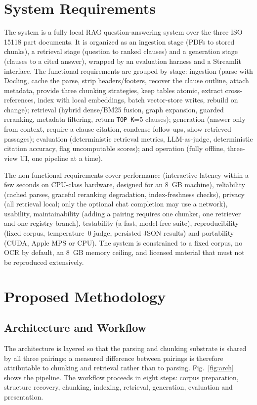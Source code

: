 \documentclass[conference]{IEEEtran}
\begin{document}
\section{System Requirements}
The system is a fully local RAG question-answering system over the three ISO 15118 part documents. It is organized as an ingestion stage (PDFs to stored chunks), a retrieval stage (question to ranked clauses) and a generation stage (clauses to a cited answer), wrapped by an evaluation harness and a Streamlit interface. The functional requirements are grouped by stage: ingestion (parse with Docling, cache the parse, strip headers/footers, recover the clause outline, attach metadata, provide three chunking strategies, keep tables atomic, extract cross-references, index with local embeddings, batch vector-store writes, rebuild on change); retrieval (hybrid dense/BM25 fusion, graph expansion, guarded reranking, metadata filtering, return \texttt{TOP\_K}=5 clauses); generation (answer only from context, require a clause citation, condense follow-ups, show retrieved passages); evaluation (deterministic retrieval metrics, LLM-as-judge, deterministic citation accuracy, flag uncomputable scores); and operation (fully offline, three-view UI, one pipeline at a time).

The non-functional requirements cover performance (interactive latency within a few seconds on CPU-class hardware, designed for an 8~GB machine), reliability (cached parses, graceful reranking degradation, index-freshness checks), privacy (all retrieval local; only the optional chat completion may use a network), usability, maintainability (adding a pairing requires one chunker, one retriever and one registry branch), testability (a fast, model-free suite), reproducibility (fixed corpus, temperature~0 judge, persisted JSON results) and portability (CUDA, Apple MPS or CPU). The system is constrained to a fixed corpus, no OCR by default, an 8~GB memory ceiling, and licensed material that must not be reproduced extensively.

\section{Proposed Methodology}
\subsection{Architecture and Workflow}
The architecture is layered so that the parsing and chunking substrate is shared by all three pairings; a measured difference between pairings is therefore attributable to chunking and retrieval rather than to parsing. Fig.~\ref{fig:arch} shows the pipeline. The workflow proceeds in eight steps: corpus preparation, structure recovery, chunking, indexing, retrieval, generation, evaluation and presentation.
\end{document}
